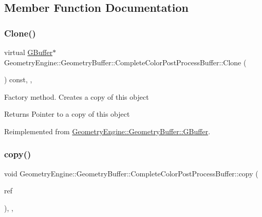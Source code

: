 \subsection{Member Function Documentation}
\mbox{\label{class_geometry_engine_1_1_geometry_buffer_1_1_complete_color_post_process_buffer_a8a484d5196bba7b92f31e500229743bc}} 
\subsubsection{\texorpdfstring{Clone()}{Clone()}}
{\footnotesize\ttfamily virtual \mbox{\hyperlink{class_geometry_engine_1_1_geometry_buffer_1_1_g_buffer}{G\+Buffer}}$\ast$ Geometry\+Engine\+::\+Geometry\+Buffer\+::\+Complete\+Color\+Post\+Process\+Buffer\+::\+Clone (\begin{DoxyParamCaption}{ }\end{DoxyParamCaption}) const\hspace{0.3cm}{\ttfamily [inline]}, {\ttfamily [override]}, {\ttfamily [virtual]}}

Factory method. Creates a copy of this object \begin{DoxyReturn}{Returns}
Pointer to a copy of this object 
\end{DoxyReturn}


Reimplemented from \mbox{\hyperlink{class_geometry_engine_1_1_geometry_buffer_1_1_g_buffer_af993f8c23f7e78051f3071be4873af9d}{Geometry\+Engine\+::\+Geometry\+Buffer\+::\+G\+Buffer}}.

\mbox{\label{class_geometry_engine_1_1_geometry_buffer_1_1_complete_color_post_process_buffer_ac7d1a90658b1a2f59674b76685e8b052}} 
\subsubsection{\texorpdfstring{copy()}{copy()}}
{\footnotesize\ttfamily void Geometry\+Engine\+::\+Geometry\+Buffer\+::\+Complete\+Color\+Post\+Process\+Buffer\+::copy (\begin{DoxyParamCaption}\item[{const \mbox{\hyperlink{class_geometry_engine_1_1_geometry_buffer_1_1_g_buffer}{G\+Buffer}} \&}]{ref }\end{DoxyParamCaption})\hspace{0.3cm}{\ttfamily [override]}, {\ttfamily [protected]}, {\ttfamily [virtual]}}

